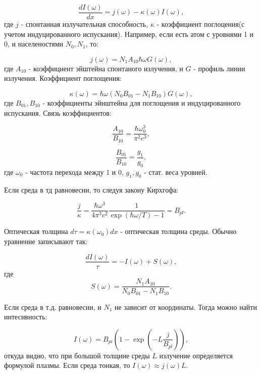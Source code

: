 \documentclass[10pt, a4paper]{article}
\begin{document}
\begin{equation}
    \frac{dI(\omega)}{dx}=j(\omega)-\kappa(\omega)I(\omega),
\end{equation}
где $j$ - спонтанная излучательная способность, $\kappa$ - коэффициент поглоцения(с учетом индуцированного испускания).
Например, если есть атом с уровнями 1 и 0, и населеностями $N_0, N_1$, то:

\begin{equation}
    j(\omega)=N_1 A_{10}\hbar \omega G(\omega),
\end{equation}
где $A_{10}$ - коэффициент эйштейна спонтаного излучения, и $G$ - профиль линии излучения. Коэффициент поглощения:

\begin{equation}
    \kappa(\omega)=\hbar\omega (N_0 B_{01} - N_1 B_{10})G(\omega),
\end{equation}
где $B_{01}, B_{10}$ - коэффициенты эйнштейна для поглощения и индуцированного испускания. Связь коэффициентов:

\begin{equation}
    \frac{A_{10}}{B_{10}}=\frac{\hbar\omega_0^3}{\pi^2c^3},
\end{equation}

\begin{equation}
    \frac{B_{01}}{B_{10}}=\frac{g_1}{g_0},
\end{equation}
где $\omega_0$ - частота перехода между 1 и 0, $g_1, g_0$ - стат. веса уровней.

Если среда в тд равновесии, то следуя закону Кирхгофа:

\begin{equation}
    \frac{j}{\kappa}=\frac{\hbar\omega^3}{4\pi^3c^2}\frac{1}{\exp(\hbar\omega/T)-1}=B_{pl}.
\end{equation}

Оптическая толщина $d\tau=\kappa(\omega_0)dx$ - оптическая толщина среды. Обычно уравнение записывают так:

\begin{equation}
    \frac{dI(\omega)}{\tau}=-I(\omega) + S(\omega),
\end{equation}
где
\begin{equation}
    S(\omega) = \frac{N_1 A_{10}}{N_0 B_{01} - N_1 B_{10}}.
\end{equation}

Если среда в т.д. равновесии, и $N_1$ не зависит от координаты. Тогда можно найти интесивность:

\begin{equation}
    I(\omega) = B_{pi}\left( 1 - \exp(-L\frac{j}{B_{pl}})\right),
\end{equation}
откуда видно, что при большой толщине среды $L$ излучение определяется формулой плазмы. Если среда тонкая, то 
$I(\omega)\approx j(\omega)L$.
\end{document}

